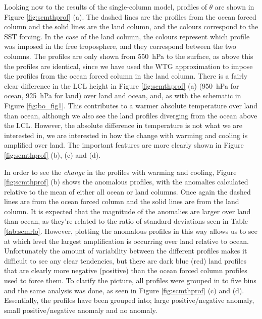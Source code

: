 Looking now to the results of the single-column model, profiles of $\theta$ are 
shown in Figure \ref{fig:scmthprof} (a). The dashed lines are the profiles from 
the ocean forced column and the solid lines are the land column, and the colours 
correspond to the SST forcing. In the case of the land column, the colours 
represent which profile was imposed in the free troposphere, and they correspond 
between the two columns. The profiles are only shown from 
\SI{550}{\hecto\pascal} to the surface, as above this the profiles are 
identical, since we have used the WTG approximation to impose the profiles from 
the ocean forced column in the land column. There is a fairly clear difference 
in the LCL height in Figure \ref{fig:scmthprof} (a) (\SI{950}{\hecto\pascal} for 
ocean, \SI{925}{\hecto\pascal} for land) over land and ocean, and, as with the 
schematic in Figure \ref{fig:bo_fig1}. This contributes to a warmer absolute 
temperature over land than ocean, although we also see the land profiles 
diverging from the ocean above the LCL.  However, the absolute difference in 
temperature is not what we are interested in, we are interested in how the 
change with warming and cooling is amplified over land.  The important features 
are more clearly shown in Figure \ref{fig:scmthprof} (b), (c) and (d).

In order to see the \textit{change} in the profiles with warming and cooling, 
Figure \ref{fig:scmthprof} (b) shows the anomalous profiles, with the anomalies 
calculated relative to the mean of either all ocean or land columns. Once again 
the dashed lines are from the ocean forced column and the solid lines are from 
the land column. It is expected that the magnitude of the anomalies are larger 
over land than ocean, as they're related to the ratio of standard deviations 
seen in Table \ref{tab:scmrlo}. However, plotting the anomalous profiles in this 
way allows us to see at which level the largest amplification is occurring over 
land relative to ocean.  Unfortunately the amount of variability between the 
different profiles makes it difficult to see any clear tendencies, but there are 
dark blue (red) land profiles that are clearly more negative (positive) than the 
ocean forced column profiles used to force them. To clarify the picture, all 
profiles were grouped in to five bins and the same analysis was done, as seen in 
Figure \ref{fig:scmthprof} (c) and (d). Essentially, the profiles have been 
grouped into; large positive/negative anomaly, small positive/negative anomaly 
and no anomaly.  

